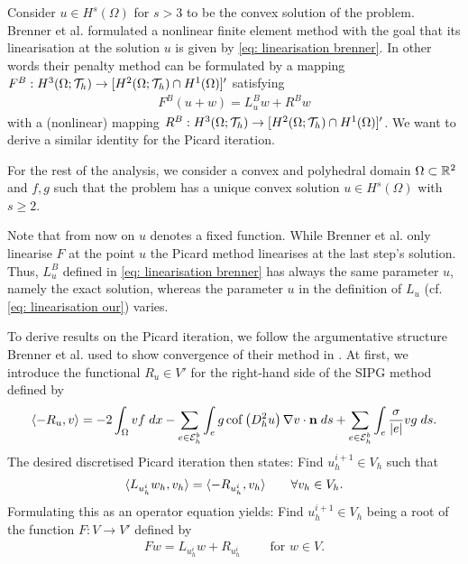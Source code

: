 Consider $u\in H^s(\Omega)$ for $s>3$ to be the convex solution of the \MA problem. Brenner et al. formulated a nonlinear finite element method with the goal that its linearisation at the solution $u$ is given by \eqref{eq: linearisation brenner}. In other words their penalty method can be formulated by a mapping $F^B:H^3(\Omega; \mathcal{T}_h) \rightarrow [H^2(\Omega; \mathcal{T}_h) \cap H^1(\Omega)]'$ satisfying
 \begin{align}
 	F^B(u +w ) = L^B_u w + R^Bw \label{eq: add brenner method}
 \end{align}
 with a (nonlinear) mapping $R^B:H^3(\Omega; \mathcal{T}_h) \rightarrow [H^2(\Omega; \mathcal{T}_h) \cap H^1(\Omega)]'$. 
% 
We want to derive a similar identity for the Picard iteration. 

For the rest of the analysis, we consider a convex and polyhedral domain $\Omega\subset \mathbb{R}^2$ and $f,g$ such that the \MA problem has a unique convex solution $u \in H^s(\Omega)$ with $s\geq 2$. 

Note that from now on $u$ denotes a fixed function. While Brenner et al. only linearise $F$ at the point $u$ the Picard method linearises at the last step's solution. Thus, $L_u^B$ defined in \eqref{eq: linearisation brenner} has always the same parameter $u$, namely the exact solution, whereas the parameter $u$ in the definition of $L_u$ (cf. \eqref{eq: linearisation our}) varies. 

To derive results on the Picard iteration, we follow the argumentative structure Brenner et al. used to show convergence of their method in \cite{BGN+2011}. At first, we introduce the functional $R_u \in V'$ for the right-hand side of the SIPG method defined by
\begin{align}
 \langle -R_u, v \rangle = - 2 \int_{\Omega} {{v f}\;dx}
-\sum\limits_{e \in \mathcal{E}_h^b}\int_{e} {{ g \operatorname{cof} \left( D_h^2 u \right) \nabla v \cdot \mathbf n }\;ds}
+\sum\limits_{e \in \mathcal{E}_h^b} \int_{e} {{ \frac \sigma {|e|} v g}\;ds}. \label{eq: definition R}
\end{align}
The desired discretised Picard iteration then states: Find $u^{i+1}_h \in V_h$ such that
\begin{align}
 \langle L_{u^i_h} w_h, v_h \rangle =   \langle -R_{u^i_h}, v_h \rangle   \qquad \forall v_h \in V_h. \label{eq: fixed point functional}
\end{align}
Formulating this as an operator equation yields: Find $u_h^{i+1} \in V_h$ being a root of the function $F:V \rightarrow V'$ defined by
\begin{align}
 {Fw} =  L_{u^i_h} w + R_{u^i_h}  \qquad \text{ for } w \in V. \label{eq: definition F}
\end{align}



